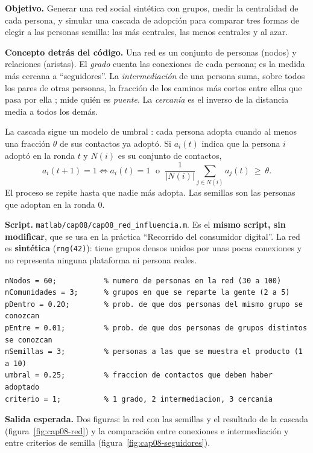 \begin{cajaLaboratorio}
\textbf{Objetivo.} Generar una red social sintética con grupos, medir la
centralidad de cada persona, y simular una cascada de adopción para
comparar tres formas de elegir a las personas semilla: las más centrales,
las menos centrales y al azar.

\textbf{Concepto detrás del código.} Una red es un conjunto de personas
(nodos) y relaciones (aristas). El \emph{grado} cuenta las conexiones de cada
persona; es la medida más cercana a \enquote{seguidores}. La
\emph{intermediación} de una persona suma, sobre todos los pares de otras
personas, la fracción de los caminos más cortos entre ellas que pasa por
ella \parencite{brandes2001}; mide quién es \emph{puente}. La
\emph{cercanía} es el inverso de la distancia media a todos los demás.

La cascada sigue un modelo de umbral \parencite{granovetter1978}: cada
persona adopta cuando al menos una fracción $\theta$ de sus contactos ya
adoptó. Si $a_i(t)$ indica que la persona $i$ adoptó en la ronda $t$ y $N(i)$
es su conjunto de contactos,
\[
  a_i(t+1)=1 \iff a_i(t)=1 \;\text{ o }\; \frac{1}{|N(i)|}\sum_{j\in N(i)} a_j(t)\ \ge\ \theta .
\]
El proceso se repite hasta que nadie más adopta. Las semillas son las
personas que adoptan en la ronda 0.

\textbf{Script.} \texttt{matlab/cap08/cap08\_red\_influencia.m}. Es el
\textbf{mismo script, sin modificar}, que se usa en la práctica
\enquote{Recorrido del consumidor digital}. La red es \textbf{sintética}
(\texttt{rng(42)}): tiene grupos densos unidos por unas pocas conexiones y no
representa ninguna plataforma ni persona reales.

\begin{lstlisting}[style=MATLABStyle, caption={Bloque de parámetros editable (\texttt{cap08\_red\_influencia.m}) — es lo único que cambia entre corridas.}]
nNodos = 60;           % numero de personas en la red (30 a 100)
nComunidades = 3;      % grupos en que se reparte la gente (2 a 5)
pDentro = 0.20;        % prob. de que dos personas del mismo grupo se conozcan
pEntre = 0.01;         % prob. de que dos personas de grupos distintos se conozcan
nSemillas = 3;         % personas a las que se muestra el producto (1 a 10)
umbral = 0.25;         % fraccion de contactos que deben haber adoptado
criterio = 1;          % 1 grado, 2 intermediacion, 3 cercania
\end{lstlisting}

\textbf{Salida esperada.} Dos figuras: la red con las semillas y el
resultado de la cascada (figura~\ref{fig:cap08-red}) y la comparación entre
conexiones e intermediación y entre criterios de semilla
(figura~\ref{fig:cap08-seguidores}).


\end{cajaLaboratorio}
